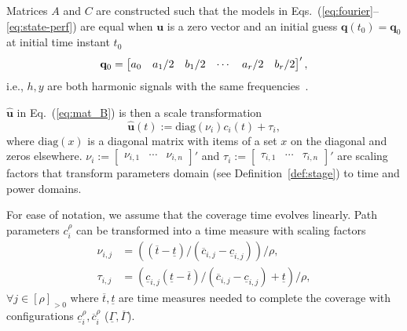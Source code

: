 \documentclass[letterpaper,10pt,journal,twoside]{IEEEtran}
\theoremstyle{definition}
\newtheorem{lem}[thm]{Lemma}
\begin{document}
{\color{blue}Matrices $A$ and $C$ are constructed such that t}he %
models in Eqs.~(\ref{eq:fourier}--\ref{eq:state-perf}) are equal
when $\mathbf{u}$ is a zero vector %
and an initial guess $\mathbf{q}(t_0)=\mathbf{q}_0$ at initial time instant $t_0$
  {\color{blue}\begin{equation}
  {\color{black}\mathbf{q}_0=\begin{bmatrix}a_0 & a_1/2 & b_1/2 & \cdots & a_r/2 & b_r/2\end{bmatrix}',}
  \end{equation}}
i.e., $h,y$ are both harmonic signals with the same frequencies{\color{blue}~\cite{seewaldphdthesis}}.

$\hat{\mathbf{u}}$ in Eq.~(\ref{eq:mat_B}) is then a scale transformation
\begin{equation}
  \hat{\mathbf{u}}(t):=\mathrm{diag}(\nu_i)c_i(t)+\tau_i,
\end{equation}
where $\mathrm{diag}(x)$ is a diagonal matrix with items of a set $x$ on the diagonal and zeros elsewhere. $\nu_i:=\begin{bmatrix}\nu_{i,1}&\cdots&\nu_{i,n}\end{bmatrix}'$ and $\tau_i:=\begin{bmatrix}\tau_{i,1}&\cdots&\tau_{i,n}\end{bmatrix}'$ are scaling factors that transform parameters domain (see Definition~\ref{def:stage}) to time and power domains.

For ease of notation, we assume that the coverage time evolves linearly. Path parameters $c_i^\rho$ can be transformed into a time measure with scaling factors\begin{subequations}\label{eq:scale-traj}\begin{align}
  \nu_{i,j}&=\left((\overline{t}-\underline{t})/(\overline{c}_{i,j}-\underline{c}_{i,j})\right)/\rho,\\
  \tau_{i,j}&=\left(\underline{c}_{i,j}(\underline{t}-\overline{t})/(\overline{c}_{i,j}-\underline{c}_{i,j})+\underline{t}\right)/\rho,
\end{align}\end{subequations} 
$\forall j\in[\rho]_{>0}$ where $\overline{t},\underline{t}$ are time measures needed to complete the coverage with configurations $\underline{c}_i^\rho,\overline{c}_i^\rho$ ($\underline{\Gamma},\overline{\Gamma}$).
\end{document}

